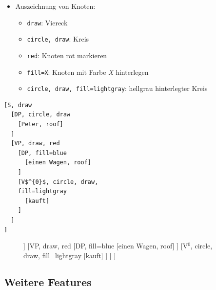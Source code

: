\begin{frame}[fragile]

\begin{itemize}
	\item Auszeichnung von Knoten:
	
	\begin{itemize}
		\item \lstinline|draw|: Viereck
		\item \lstinline|circle, draw|: Kreis
		\item \lstinline|red|: Knoten rot markieren
		\item \lstinline|fill=X|: Knoten mit Farbe \emph{X} hinterlegen
		\item \lstinline|circle, draw, fill=lightgray|: hellgrau hinterlegter Kreis 
	\end{itemize}
\end{itemize}

\end{frame}


\begin{frame}[fragile]

\begin{minipage}[t]{.6\textwidth}
\begin{lstlisting}
[S, draw
  [DP, circle, draw
    [Peter, roof]
  ]
  [VP, draw, red 
    [DP, fill=blue 
      [einen Wagen, roof]
    ]
    [V$^{0}$, circle, draw,
    fill=lightgray
      [kauft]
    ]
  ]
]
\end{lstlisting}
\end{minipage}
\begin{minipage}[t]{.38\textwidth}
	
\begin{figure}
\centering 
\begin{forest}
[S, draw
	[DP, circle, draw
		[Peter, roof]
	]
	[VP, draw, red 
		[DP, fill=blue 
			[einen Wagen, roof]
		]
		[V$^{0}$, circle, draw, 
		fill=lightgray
			[kauft]
		]
	]
]
\end{forest}
\end{figure}
\end{minipage}

\end{frame}


\subsection{Weitere Features}

